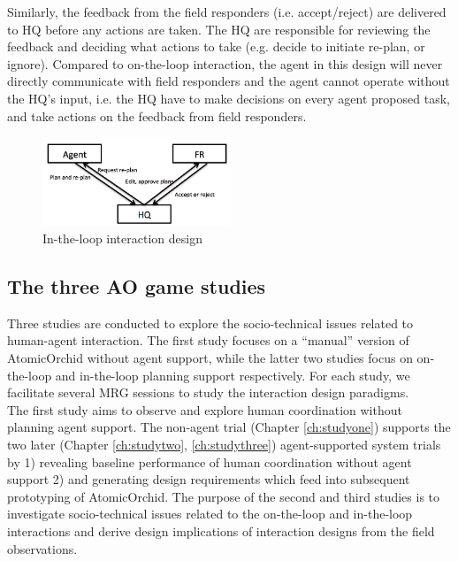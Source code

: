Similarly, the feedback from the field responders (i.e. accept/reject) are delivered to HQ before any actions are taken. The HQ are responsible for reviewing the feedback and deciding what actions to take (e.g. decide to initiate re-plan, or ignore). Compared to on-the-loop interaction, the agent in this design will never directly communicate with field responders and the agent cannot operate without the HQ's input, i.e. the HQ have to make decisions on every agent proposed task, and take actions on the feedback from field responders. \\

\begin{figure}[h]
  \centering
  \includegraphics[width=0.5\textwidth]{img/approach/InTheLoop}
  \caption{In-the-loop interaction design}
  \label{fig:InTheLoop}
\end{figure}


\subsection{The three AO game studies}
Three studies are conducted to explore the socio-technical issues related to human-agent interaction. The first study focuses on a ``manual'' version of AtomicOrchid without agent support, while the latter two studies focus on on-the-loop and in-the-loop planning support respectively. For each study, we facilitate several \acf{MRG} sessions to study the interaction design paradigms. \\ 

The first study aims to observe and explore human coordination without planning agent support. The non-agent trial (Chapter \ref{ch:studyone}) supports the two later (Chapter \ref{ch:studytwo}, \ref{ch:studythree}) agent-supported system trials by 1) revealing baseline performance of human coordination without agent support 2) and generating design requirements which feed into subsequent prototyping of AtomicOrchid. The purpose of the second and third studies is to investigate socio-technical issues related to the on-the-loop and in-the-loop interactions and derive design implications of interaction designs from the field observations.\\

